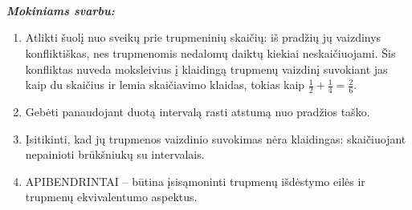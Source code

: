 \documentclass[a4paper]{article}
\begin{document}
\\ \\ \\ \\ \\ \\ \\ \\

\textbf{\textit{Mokiniams svarbu:}}
\begin{enumerate}
\item Atlikti šuolį nuo sveikų prie trupmeninių skaičių: iš pradžių jų vaizdinys konfliktiškas, nes trupmenomis nedalomų daiktų kiekiai neskaičiuojami. Šis konfliktas nuveda moksleivius į klaidingą trupmenų vaizdinį suvokiant jas kaip du skaičius ir lemia skaičiavimo klaidas, tokias kaip $\frac{1}{2}+\frac{1}{4}=\frac{2}{6}$. 
\item Gebėti panaudojant duotą intervalą rasti atstumą nuo pradžios taško. 
\item Įsitikinti, kad jų trupmenos vaizdinio suvokimas nėra klaidingas: skaičiuojant nepainioti brūkšniukų su intervalais.
\item APIBENDRINTAI –  būtina įsisąmoninti trupmenų išdėstymo eilės ir trupmenų ekvivalentumo aspektus.
\end{enumerate}
\end{document}
